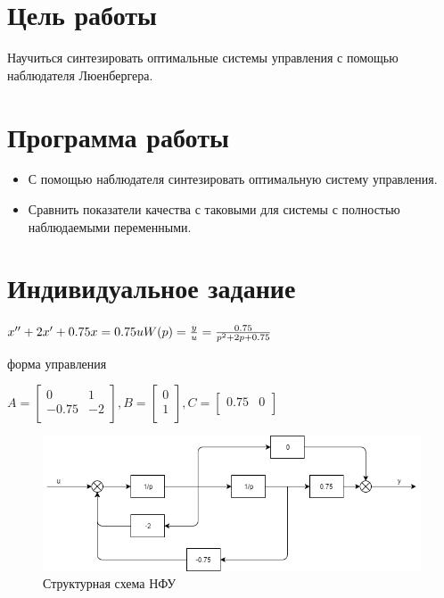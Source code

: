 





\def\contentsname{Содержание}
\tableofcontents
\newpage

\section{Цель работы}

Научиться синтезировать оптимальные системы управления с помощью наблюдателя Люенбергера.

\section{Программа работы}

\begin{itemize}
	\item С помощью наблюдателя  синтезировать оптимальную систему управления.
	\item Сравнить показатели качества с таковыми для системы с полностью наблюдаемыми переменными.
\end{itemize}

\section{Индивидуальное задание}

$
\\
x'' + 2x' + 0.75x = 0.75u\\\\
W(p)=\frac{y}{u}=\frac{0.75}{p^2+2p+0.75} \\
$

 форма управления

\noindent$A=
	\begin{bmatrix}
	0 & 1 \\
	-0.75 & -2 \\
	\end{bmatrix}
	, B=
	\begin{bmatrix}
	0 \\
	1 \\
	\end{bmatrix}
	, C=
	\begin{bmatrix}
	0.75 & 0 \\
	\end{bmatrix}
	$
	
\begin{figure}[h!]
	\centering
	\includegraphics[scale = 0.73]{images/nfu.png}
	\caption{Структурная схема НФУ}
	\label{image:1}
\end{figure}	
\FloatBarrier

